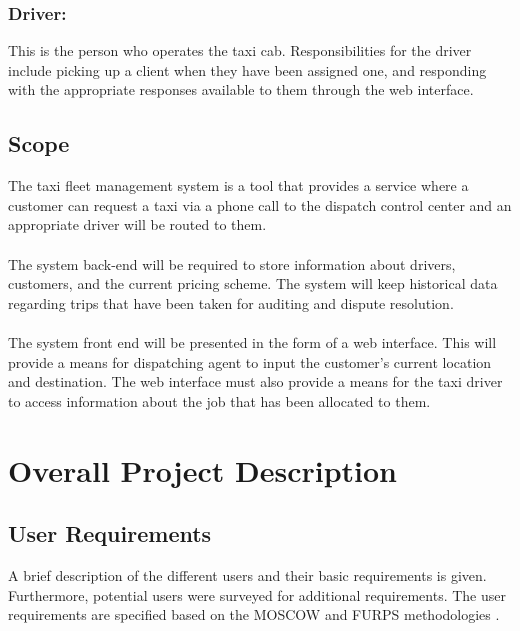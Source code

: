 \documentclass[10pt,twocolumn]{witseiepaper}
\begin{document}
\subsubsection{Driver:}
This is the person who operates the taxi cab. Responsibilities for the driver include picking up a client when they have been assigned one, and responding with the appropriate responses available to them through the web interface.

\subsection{Scope}

The taxi fleet management system is a tool that provides a service where a customer can request a taxi via a phone call to the dispatch control center and an appropriate driver will be routed to them.\\\\
The system back-end will be required to store information about drivers, customers, and the current pricing scheme. The system will keep historical data regarding trips that have been taken for auditing and dispute resolution.\\\\
The system front end will be presented in the form of a web interface. This will provide a means for dispatching agent to input the customer's current location and destination. The web interface must also provide a means for the taxi driver to access information about the job that has been allocated to them.

\section{Overall Project Description}

\subsection{User Requirements}
A brief description of the different users and their basic requirements is given. Furthermore, potential users were surveyed for additional requirements. The user requirements are specified based on the MOSCOW and FURPS methodologies \cite{SoftwareEngTextbook}.
\end{document}
